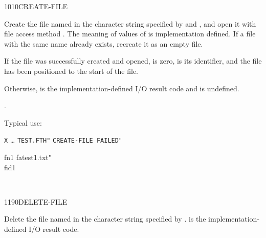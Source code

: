 \begin{worddef}{1010}{CREATE-FILE}
\item {}

	Create the file named in the character string specified by
	 and , and open it with file access method
	. The meaning of values of  is
	implementation defined. If a file with the same name already
	exists, recreate it as an empty file.

	If the file was successfully created and opened,  is
	zero,  is its identifier, and the file has been
	positioned to the start of the file.

	Otherwise,  is the implementation-defined I/O result
	code and  is undefined.

\see {}.

	\begin{rationale} %
		Typical use:

		\tab \word[core]{:} \texttt{X} {\ldots}
				 \texttt{TEST.FTH"} 
				 \texttt{CREATE-FILE FAILED"}
			\word[core]{;}
	\end{rationale}

	\begin{testing}\ttfamily
		\word{:} fn1  fatest1.txt" \word{;} \\
		 fid1

		 \\
	\end{testing}
\end{worddef}


\begin{worddef}{1190}{DELETE-FILE}
\item {}

	Delete the file named in the character string specified by
	.  is the implementation-defined
	I/O result code.

	\begin{testing}
		 \\
		 \\
	\end{testing}
\end{worddef}


